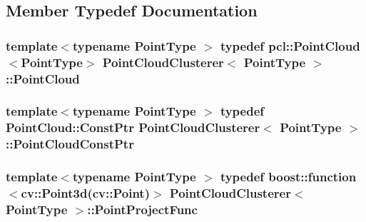 \subsection{Member Typedef Documentation}
\hypertarget{class_point_cloud_clusterer_aeac82c7494ccf2580112ef55d7e30b39}{
\subsubsection[{Point\-Cloud}]{\setlength{\rightskip}{0pt plus 5cm}template$<$typename Point\-Type $>$ typedef pcl\-::\-Point\-Cloud$<$Point\-Type$>$ {\bf Point\-Cloud\-Clusterer}$<$ Point\-Type $>$\-::{\bf Point\-Cloud}}}\label{class_point_cloud_clusterer_aeac82c7494ccf2580112ef55d7e30b39}
\hypertarget{class_point_cloud_clusterer_a042579611b15a7ae275603b624df3968}{
\subsubsection[{Point\-Cloud\-Const\-Ptr}]{\setlength{\rightskip}{0pt plus 5cm}template$<$typename Point\-Type $>$ typedef Point\-Cloud\-::\-Const\-Ptr {\bf Point\-Cloud\-Clusterer}$<$ Point\-Type $>$\-::{\bf Point\-Cloud\-Const\-Ptr}}}\label{class_point_cloud_clusterer_a042579611b15a7ae275603b624df3968}
\hypertarget{class_point_cloud_clusterer_adc13c5f02a2a888f33eedbc33188f202}{
\subsubsection[{Point\-Project\-Func}]{\setlength{\rightskip}{0pt plus 5cm}template$<$typename Point\-Type $>$ typedef boost\-::function$<$cv\-::\-Point3d(cv\-::\-Point)$>$ {\bf Point\-Cloud\-Clusterer}$<$ Point\-Type $>$\-::{\bf Point\-Project\-Func}}}\label{class_point_cloud_clusterer_adc13c5f02a2a888f33eedbc33188f202}


